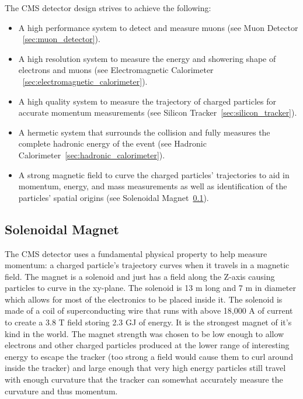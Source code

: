 The CMS detector design strives to achieve the following:
\begin{itemize}
\item A high performance system to detect and measure muons (see Muon Detector ~\ref{sec:muon_detector}).
\item A high resolution system to measure the energy and showering shape of electrons and muons (see Electromagnetic Calorimeter ~\ref{sec:electromagnetic_calorimeter}).
\item A high quality system to measure the trajectory of charged particles for accurate momentum measurements (see Silicon Tracker~\ref{sec:silicon_tracker}).
\item A hermetic system that surrounds the collision and fully measures the complete hadronic energy of the event (see Hadronic Calorimeter~\ref{sec:hadronic_calorimeter}).
\item A strong magnetic field to curve the charged particles' trajectories to aid in momentum, energy, and mass measurements as well as identification of the particles' spatial origins (see Solenoidal Magnet~\ref{sec:solenoidal_magnet}).
\end{itemize}

	\subsection{Solenoidal Magnet}
	\label{sec:solenoidal_magnet}
The CMS detector uses a fundamental physical property to help measure momentum: a charged particle's trajectory curves when it travels in a magnetic field. The magnet is a solenoid and just has a field along the Z-axis causing particles to curve in the xy-plane. The solenoid is 13 m long and 7 m in diameter which allows for most of the electronics to be placed inside it. The solenoid is made of a coil of superconducting wire that runs with above  18,000 A of current to create a 3.8 T field storing 2.3 GJ of energy. It is the strongest magnet of it's kind in the world. The magnet strength was chosen to be low enough to allow electrons and other charged particles produced at the lower range of interesting energy to escape the tracker (too strong a field would cause them to curl around inside the tracker) and large enough that very high energy particles still travel with enough curvature that the tracker can somewhat accurately measure the curvature and thus momentum.		
		
